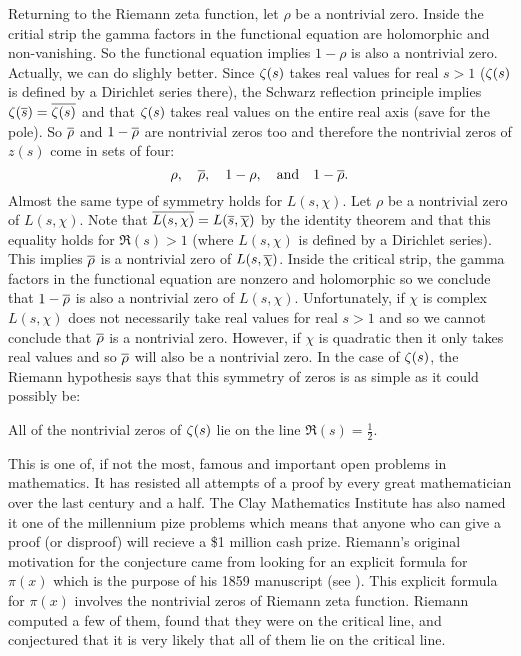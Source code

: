       Returning to the Riemann zeta function, let $\rho$ be a nontrivial zero. Inside the critial strip the gamma factors in the functional equation are holomorphic and non-vanishing. So the functional equation implies $1-\rho$ is also a nontrivial zero. Actually, we can do slighly better. Since $\zeta(s)$ takes real values for real $s > 1$ ($\zeta(s)$ is defined by a Dirichlet series there), the Schwarz reflection principle implies $\zeta(\overline{s}) = \overline{\zeta(s)}$ and that $\zeta(s)$ takes real values on the entire real axis (save for the pole). So $\overline{\rho}$ and $1-\overline{\rho}$ are nontrivial zeros too and therefore the nontrivial zeros of $z(s)$ come in sets of four:
      \[
        \rho, \quad \overline{\rho}, \quad 1-\rho, \quad \text{and} \quad 1-\overline{\rho}.
      \]
      Almost the same type of symmetry holds for $L(s,\chi)$. Let $\rho$ be a nontrivial zero of $L(s,\chi)$. Note that $\overline{L(s,\chi)} = L(\overline{s},\overline{\chi})$ by the identity theorem and that this equality holds for $\Re(s) > 1$ (where $L(s,\chi)$ is defined by a Dirichlet series). This implies $\overline{\rho}$ is a nontrivial zero of $L(s,\overline{\chi})$. Inside the critical strip, the gamma factors in the functional equation are nonzero and holomorphic so we conclude that $1-\overline{\rho}$ is also a nontrivial zero of $L(s,\chi)$. Unfortunately, if $\chi$ is complex $L(s,\chi)$ does not necessarily take real values for real $s > 1$ and so we cannot conclude that $\overline{\rho}$ is a nontrivial zero. However, if $\chi$ is quadratic then it only takes real values and so $\overline{\rho}$ will also be a nontrivial zero. In the case of $\zeta(s)$, the Riemann hypothesis says that this symmetry of zeros is as simple as it could possibly be:

      \begin{theorem}
        All of the nontrivial zeros of $\zeta(s)$ lie on the line $\Re(s) = \frac{1}{2}$.
      \end{theorem}

      This is one of, if not the most, famous and important open problems in mathematics. It has resisted all attempts of a proof by every great mathematician over the last century and a half. The Clay Mathematics Institute has also named it one of the millennium pize problems which means that anyone who can give a proof (or disproof) will recieve a \$1 million cash prize. Riemann's original motivation for the conjecture came from looking for an explicit formula for $\pi(x)$ which is the purpose of his 1859 manuscript (see \cite{riemann1859ueber}). This explicit formula for $\pi(x)$ involves the nontrivial zeros of Riemann zeta function. Riemann computed a few of them, found that they were on the critical line, and conjectured that it is very likely that all of them lie on the critical line.

